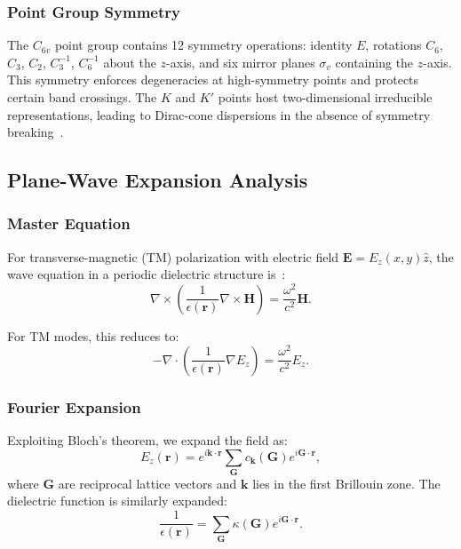 \subsubsection{Point Group Symmetry}

The $C_{6v}$ point group contains 12 symmetry operations: identity $E$, rotations $C_6$, $C_3$, $C_2$, $C_3^{-1}$, $C_6^{-1}$ about the $z$-axis, and six mirror planes $\sigma_v$ containing the $z$-axis. This symmetry enforces degeneracies at high-symmetry points and protects certain band crossings. The $K$ and $K'$ points host two-dimensional irreducible representations, leading to Dirac-cone dispersions in the absence of symmetry breaking~\cite{Haldane2008,Raghu2008}.

\subsection{Plane-Wave Expansion Analysis}

\subsubsection{Master Equation}

For transverse-magnetic (TM) polarization with electric field $\mathbf{E} = E_z(x,y) \hat{z}$, the wave equation in a periodic dielectric structure is~\cite{Joannopoulos2008}:
\begin{equation}
\nabla \times \left( \frac{1}{\epsilon(\mathbf{r})} \nabla \times \mathbf{H} \right) = \frac{\omega^2}{c^2} \mathbf{H}.
\label{eq:master}
\end{equation}

For TM modes, this reduces to:
\begin{equation}
-\nabla \cdot \left( \frac{1}{\epsilon(\mathbf{r})} \nabla E_z \right) = \frac{\omega^2}{c^2} E_z.
\label{eq:tm_scalar}
\end{equation}

\subsubsection{Fourier Expansion}

Exploiting Bloch's theorem, we expand the field as:
\begin{equation}
E_z(\mathbf{r}) = e^{i\mathbf{k} \cdot \mathbf{r}} \sum_{\mathbf{G}} c_{\mathbf{k}}(\mathbf{G}) e^{i\mathbf{G} \cdot \mathbf{r}},
\end{equation}
where $\mathbf{G}$ are reciprocal lattice vectors and $\mathbf{k}$ lies in the first Brillouin zone. The dielectric function is similarly expanded:
\begin{equation}
\frac{1}{\epsilon(\mathbf{r})} = \sum_{\mathbf{G}} \kappa(\mathbf{G}) e^{i\mathbf{G} \cdot \mathbf{r}}.
\end{equation}

